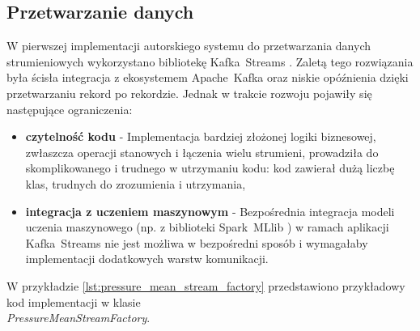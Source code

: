 \subsection{Przetwarzanie danych}

W pierwszej implementacji autorskiego systemu do przetwarzania danych strumieniowych wykorzystano bibliotekę \mbox{Kafka Streams} \cite{kafka_streams}. Zaletą tego rozwiązania była ścisła integracja z ekosystemem \mbox{Apache Kafka} \cite{kafka} oraz niskie opóźnienia dzięki przetwarzaniu rekord po rekordzie. Jednak w trakcie rozwoju pojawiły się następujące ograniczenia:

\vspace{0.3em}

\begin{itemize}
    \item \textbf{czytelność kodu} - Implementacja bardziej złożonej logiki biznesowej, zwłaszcza operacji stanowych i łączenia wielu strumieni, prowadziła do skomplikowanego i trudnego w utrzymaniu kodu: kod zawierał dużą liczbę klas, trudnych do zrozumienia i utrzymania,
    \item \textbf{integracja z uczeniem maszynowym} - Bezpośrednia integracja modeli uczenia maszynowego (np. z biblioteki \mbox{Spark MLlib} \cite{spark_mllib_reference}) w ramach aplikacji \mbox{Kafka Streams} nie jest możliwa w bezpośredni sposób i wymagałaby implementacji dodatkowych warstw komunikacji.
\end{itemize}

\vspace{0.3em}

W przykładzie \ref{lst:pressure_mean_stream_factory} przedstawiono przykładowy kod implementacji w klasie \\ \mbox{\textit{PressureMeanStreamFactory}}.

\newpage

